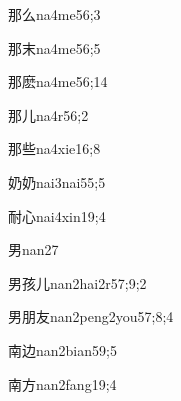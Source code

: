\begin{verbete}{那么}{na4me5}{6;3}
\end{verbete}

\begin{verbete}{那末}{na4me5}{6;5}
\end{verbete}

\begin{verbete}{那麽}{na4me5}{6;14}
\end{verbete}

\begin{verbete}{那儿}{na4r5}{6;2}
\end{verbete}

\begin{verbete}{那些}{na4xie1}{6;8}
\end{verbete}

\begin{verbete}{奶奶}{nai3nai5}{5;5}
\end{verbete}

\begin{verbete}{耐心}{nai4xin1}{9;4}
\end{verbete}

\begin{verbete}{男}{nan2}{7}
\end{verbete}

\begin{verbete}{男孩儿}{nan2hai2r5}{7;9;2}
\end{verbete}

\begin{verbete}{男朋友}{nan2peng2you5}{7;8;4}
\end{verbete}

\begin{verbete}{南边}{nan2bian5}{9;5}
\end{verbete}

\begin{verbete}{南方}{nan2fang1}{9;4}
\end{verbete}

